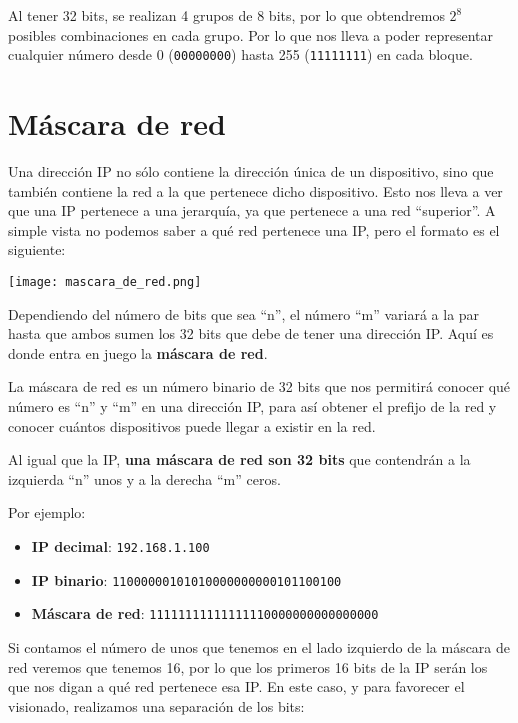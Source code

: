 Al tener 32 bits, se realizan 4 grupos de 8 bits, por lo que obtendremos \textbf{$2^{8}$} posibles combinaciones en cada grupo. Por lo que nos lleva a poder representar cualquier número desde 0 (\texttt{00000000}) hasta 255 (\texttt{11111111}) en cada bloque.



\section{Máscara de red}

Una dirección IP no sólo contiene la dirección única de un dispositivo, sino que también contiene la red a la que pertenece dicho dispositivo. Esto nos lleva a ver que una IP pertenece a una jerarquía, ya que pertenece a una red “superior”. A simple vista no podemos saber a qué red pertenece una IP, pero el formato es el siguiente:

\begin{center}
    \texttt{[image: mascara\_de\_red.png]}
\end{center}

Dependiendo del número de bits que sea “n”, el número “m” variará a la par hasta que ambos sumen los 32 bits que debe de tener una dirección IP. Aquí es donde entra en juego la \textbf{máscara de red}.

La máscara de red es un número binario de 32 bits que nos permitirá conocer qué número es “n” y “m” en una dirección IP, para así obtener el prefijo de la red y conocer cuántos dispositivos puede llegar a existir en la red.

Al igual que la IP, \textbf{una máscara de red son 32 bits} que contendrán a la izquierda “n” unos y a la derecha “m” ceros.


Por ejemplo:
\begin{itemize}
    \item \textbf{IP decimal}:\hspace{22pt} \texttt{192.168.1.100}
    \item \textbf{IP binario}:\hspace{25pt} \texttt{11000000101010000000000101100100}
    \item \textbf{Máscara de red}: \texttt{11111111111111110000000000000000}
\end{itemize}

Si contamos el número de unos que tenemos en el lado izquierdo de la máscara de red veremos que tenemos 16, por lo que los primeros 16 bits de la IP serán los que nos digan a qué red pertenece esa IP. En este caso, y para favorecer el visionado, realizamos una separación de los bits:

